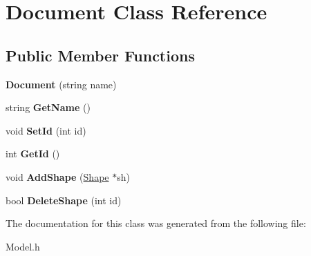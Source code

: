 \hypertarget{classDocument}{}\section{Document Class Reference}
\label{classDocument}
\subsection*{Public Member Functions}
\begin{DoxyCompactItemize}
\item 
\mbox{\label{classDocument_a3edd06d81e5d1f87564c930dbe0d1316}} 
{\bfseries Document} (string name)
\item 
\mbox{\label{classDocument_afd8d9bdd8b2936379bc22dd803b8e17d}} 
string {\bfseries Get\+Name} ()
\item 
\mbox{\label{classDocument_a096f0a4079dc0c198f03b44b73a2459e}} 
void {\bfseries Set\+Id} (int id)
\item 
\mbox{\label{classDocument_afa5eddc4bc257ce632aa408ead1c67d4}} 
int {\bfseries Get\+Id} ()
\item 
\mbox{\label{classDocument_a521cf739e7cc9cb16a45cce98073b697}} 
void {\bfseries Add\+Shape} (\hyperlink{classShape}{Shape} $\ast$sh)
\item 
\mbox{\label{classDocument_a4b30fd9612a3c84e2fff345e46d094c8}} 
bool {\bfseries Delete\+Shape} (int id)
\end{DoxyCompactItemize}


The documentation for this class was generated from the following file\+:\begin{DoxyCompactItemize}
\item 
Model.\+h\end{DoxyCompactItemize}
